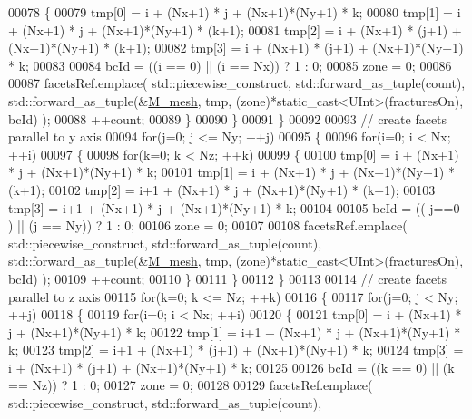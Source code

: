 \begin{DoxyCode}
00078             \{
00079                 tmp[0] = i + (Nx+1) * j + (Nx+1)*(Ny+1) * k;
00080                 tmp[1] = i + (Nx+1) * j + (Nx+1)*(Ny+1) * (k+1);
00081                 tmp[2] = i + (Nx+1) * (j+1) + (Nx+1)*(Ny+1) * (k+1);
00082                 tmp[3] = i + (Nx+1) * (j+1) + (Nx+1)*(Ny+1) * k;
00083 
00084                 bcId = ((i == 0) || (i == Nx)) ? 1 : 0;
00085                 zone = 0;
00086 
00087                 facetsRef.emplace( std::piecewise\_construct, std::forward\_as\_tuple(count), 
      std::forward\_as\_tuple(&\hyperlink{classFVCode3D_1_1CartesianGrid_a40c64e663b3d2de02b852403c75495fb}{M\_mesh}, tmp, (zone)*static\_cast<UInt>(fracturesOn), bcId) );
00088                 ++count;
00089             \}
00090         \}
00091     \}
00092 
00093     \textcolor{comment}{// create facets parallel to y axis}
00094     \textcolor{keywordflow}{for}(j=0; j <= Ny; ++j)
00095     \{
00096         \textcolor{keywordflow}{for}(i=0; i < Nx; ++i)
00097         \{
00098             \textcolor{keywordflow}{for}(k=0; k < Nz; ++k)
00099             \{
00100                 tmp[0] = i + (Nx+1) * j + (Nx+1)*(Ny+1) * k;
00101                 tmp[1] = i + (Nx+1) * j + (Nx+1)*(Ny+1) * (k+1);
00102                 tmp[2] = i+1 + (Nx+1) * j + (Nx+1)*(Ny+1) * (k+1);
00103                 tmp[3] = i+1 + (Nx+1) * j + (Nx+1)*(Ny+1) * k;
00104 
00105                 bcId = (( j==0 ) || (j == Ny)) ? 1 : 0;
00106                 zone = 0;
00107 
00108                 facetsRef.emplace( std::piecewise\_construct, std::forward\_as\_tuple(count), 
      std::forward\_as\_tuple(&\hyperlink{classFVCode3D_1_1CartesianGrid_a40c64e663b3d2de02b852403c75495fb}{M\_mesh}, tmp, (zone)*static\_cast<UInt>(fracturesOn), bcId) );
00109                 ++count;
00110             \}
00111         \}
00112     \}
00113 
00114     \textcolor{comment}{// create facets parallel to z axis}
00115     \textcolor{keywordflow}{for}(k=0; k <= Nz; ++k)
00116     \{
00117         \textcolor{keywordflow}{for}(j=0; j < Ny; ++j)
00118         \{
00119             \textcolor{keywordflow}{for}(i=0; i < Nx; ++i)
00120             \{
00121                 tmp[0] = i + (Nx+1) * j + (Nx+1)*(Ny+1) * k;
00122                 tmp[1] = i+1 + (Nx+1) * j + (Nx+1)*(Ny+1) * k;
00123                 tmp[2] = i+1 + (Nx+1) * (j+1) + (Nx+1)*(Ny+1) * k;
00124                 tmp[3] = i + (Nx+1) * (j+1) + (Nx+1)*(Ny+1) * k;
00125 
00126                 bcId = ((k == 0) || (k == Nz)) ? 1 : 0;
00127                 zone = 0;
00128 
00129                 facetsRef.emplace( std::piecewise\_construct, std::forward\_as\_tuple(count), 

\end{DoxyCode}
